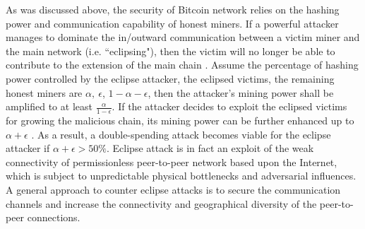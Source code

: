 As was discussed above, the security of Bitcoin network relies on the hashing power and communication capability of honest miners. If a powerful attacker manages to dominate the in/outward communication between a victim miner and the main network (i.e. ``eclipsing"), then the victim will no longer be able to contribute to the extension of the main chain . Assume the percentage of hashing power controlled by the eclipse attacker, the eclipsed victims, the remaining honest miners are $\alpha,~\epsilon$, $1-\alpha-\epsilon$, then the attacker's mining power shall be amplified to at least $\frac{\alpha}{1-\epsilon}$. If the attacker decides to exploit the eclipsed victims for growing the malicious chain, its mining power can be further enhanced up to $\alpha+\epsilon$ . As a result, a double-spending attack becomes viable for the eclipse attacker if $\alpha+\epsilon>50\%$.
Eclipse attack is in fact an exploit of the weak connectivity of permissionless peer-to-peer network based upon the Internet, which is subject to unpredictable physical bottlenecks and adversarial influences. A general approach to counter eclipse attacks is to secure the communication channels and increase the connectivity and geographical diversity of the peer-to-peer connections.

